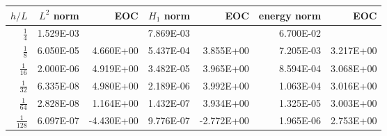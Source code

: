 \begin{table}
  \begin{tabular}{rrrrrrr}
    \hline\hline
    \textbf{$h/{L} $} & \textbf{$L^2$ norm} & \textbf{EOC} & \textbf{$H_1$ norm} & \textbf{EOC} & \textbf{energy norm} & \textbf{EOC} \\\hline
    $\frac{1}{4}$ & 1.529E-03 &  & 7.869E-03 &  & 6.700E-02 &  \\
    $\frac{1}{8}$ & 6.050E-05 & 4.660E+00 & 5.437E-04 & 3.855E+00 & 7.205E-03 & 3.217E+00 \\
    $\frac{1}{16}$ & 2.000E-06 & 4.919E+00 & 3.482E-05 & 3.965E+00 & 8.594E-04 & 3.068E+00 \\
    $\frac{1}{32}$ & 6.335E-08 & 4.980E+00 & 2.189E-06 & 3.992E+00 & 1.063E-04 & 3.016E+00 \\
    $\frac{1}{64}$ & 2.828E-08 & 1.164E+00 & 1.432E-07 & 3.934E+00 & 1.325E-05 & 3.003E+00 \\
    $\frac{1}{128}$ & 6.097E-07 & -4.430E+00 & 9.776E-07 & -2.772E+00 & 1.965E-06 & 2.753E+00 \\\hline\hline
  \end{tabular}
\end{table}
